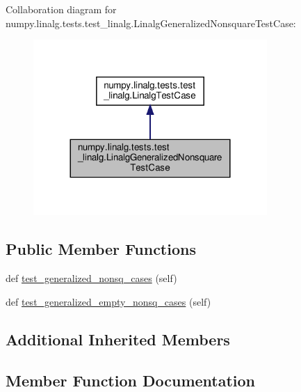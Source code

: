 Collaboration diagram for numpy.\+linalg.\+tests.\+test\+\_\+linalg.\+Linalg\+Generalized\+Nonsquare\+Test\+Case\+:
\nopagebreak
\begin{figure}[H]
\begin{center}
\leavevmode
\includegraphics[width=252pt]{classnumpy_1_1linalg_1_1tests_1_1test__linalg_1_1LinalgGeneralizedNonsquareTestCase__coll__graph}
\end{center}
\end{figure}
\subsection*{Public Member Functions}
\begin{DoxyCompactItemize}
\item 
def \hyperlink{classnumpy_1_1linalg_1_1tests_1_1test__linalg_1_1LinalgGeneralizedNonsquareTestCase_aeb55ad01c86f3c96d1aeede8a8446da5}{test\+\_\+generalized\+\_\+nonsq\+\_\+cases} (self)
\item 
def \hyperlink{classnumpy_1_1linalg_1_1tests_1_1test__linalg_1_1LinalgGeneralizedNonsquareTestCase_af0885eaeb09fb20a86e046009fec7d94}{test\+\_\+generalized\+\_\+empty\+\_\+nonsq\+\_\+cases} (self)
\end{DoxyCompactItemize}
\subsection*{Additional Inherited Members}


\subsection{Member Function Documentation}
\mbox{\label{classnumpy_1_1linalg_1_1tests_1_1test__linalg_1_1LinalgGeneralizedNonsquareTestCase_af0885eaeb09fb20a86e046009fec7d94}} 
